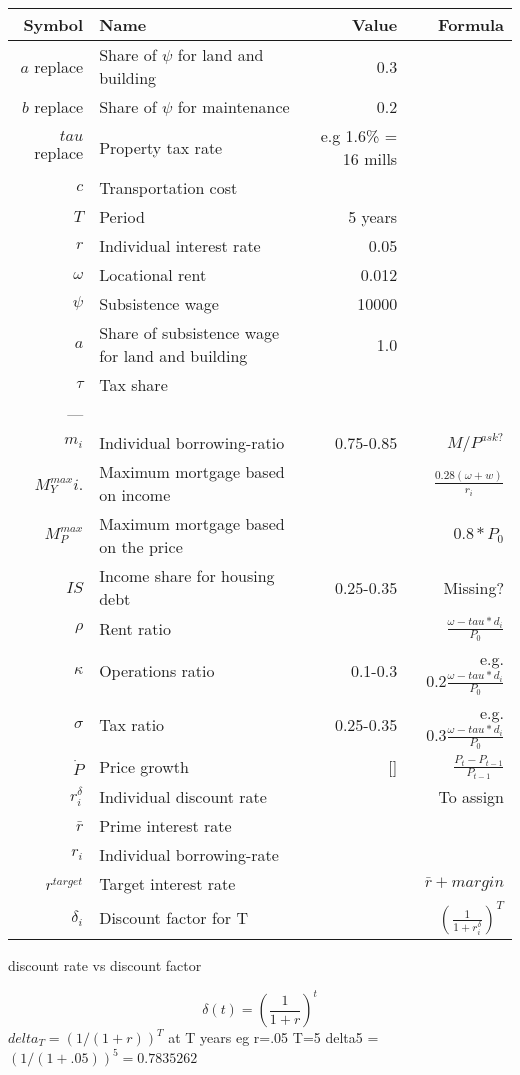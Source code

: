 \renewcommand{\arraystretch}{1.5}
\begin{tabular}{rlrr}
Symbol         & Name                                 & Value      & Formula  \\ \hline
$a$ replace    & Share of $\psi$ for land and building &   0.3         & \\
$b$ replace    & Share of $\psi$ for maintenance       &   0.2         & \\
$tau$ replace  & Property tax rate &  e.g 1.6\% = 16 mills             & \\
$c$       & Transportation cost & \\
$T$       & Period & 5 years      \\
$r$       & Individual interest rate & 0.05 \\
$\omega$  & Locational rent & 0.012  \\
$\psi$    & Subsistence wage & 10000 \\
$a$       & Share of subsistence wage for land and building & 1.0 \\
$\tau$       & Tax share & \\

---       &  & \\
$m_i$          & Individual borrowing-ratio           & 0.75-0.85  & $M/P^{ask?}$ \\
$M^{max}_Yi$.  & Maximum mortgage based on income     &            & $\frac{0.28(\omega+w)}{r_i}$ \\
 $M^{max}_P$   & Maximum mortgage based on the price  &            & $0.8*P_0$ \\
$IS$           & Income share for housing debt        & 0.25-0.35  & Missing? \\
$\rho$         & Rent ratio                           &            & $\frac{\omega-tau*d_i}{P_0}$ \\
$\kappa $      & Operations ratio                     & 0.1-0.3    & e.g. $ 0.2\frac{\omega-tau*d_i}{P_0}$ \\
$\sigma$       & Tax ratio                            & 0.25-0.35  & e.g. $ 0.3\frac{\omega-tau*d_i}{P_0}$ \\
$\dot P $      & Price growth                         & []         & $\frac{P_t-P_{t-1}}{P_{t-1}}$\\
$r_i^\delta$   & Individual discount rate             &            & To assign \\
$\bar r$       & Prime interest rate                  &            & \\
$r_i$          & Individual borrowing-rate            &            & \\
$r^{target}$   & Target interest rate                 &            & $\bar r + margin$ \\
$\delta_i$     & Discount factor for T                &            & $\left(\frac{1}{1+r_i^\delta}\right)^T$ \\


\end{tabular}
\renewcommand{\arraystretch}{1.0}




discount rate vs discount factor

\[\delta(t)=\left(\frac{1}{1+r}\right)^t\]
    $delta_T=  (1/(1+r))^T$   at T years
    eg r=.05  T=5  delta5 =  $(1/(1+.05))^5 = 0.7835262$
